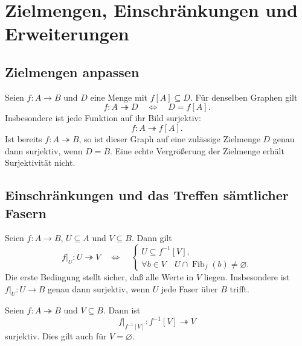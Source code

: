 \chapter{Zielmengen, Einschränkungen und Erweiterungen}
\label{b07guide:ch:restrictions}

\section{Zielmengen anpassen}

\begin{theorem}
\label{b07guide:thm:codomain}
Seien $f\colon A\to B$ und $D$ eine Menge mit $f[A]\subseteq D$.
Für denselben Graphen gilt
\[
 f\colon A\twoheadrightarrow D
 \quad\Longleftrightarrow\quad D=f[A].
\]
Insbesondere ist jede Funktion auf ihr Bild surjektiv:
\[
 f\colon A\twoheadrightarrow f[A].
\]
Ist bereits $f\colon A\twoheadrightarrow B$, so ist dieser Graph
auf eine zulässige Zielmenge $D$ genau dann surjektiv, wenn $D=B$.
Eine echte Vergrößerung der Zielmenge erhält Surjektivität nicht.
\end{theorem}

\section{Einschränkungen und das Treffen sämtlicher Fasern}

\begin{theorem}
\label{b07guide:thm:restriction}
Seien $f\colon A\to B$, $U\subseteq A$ und $V\subseteq B$.
Dann gilt
\[
 f|_U\colon U\twoheadrightarrow V
 \quad\Longleftrightarrow\quad
 \left\{
 \begin{array}{l}
 U\subseteq f^{-1}[V],\\
 \forall b\in V\quad U\cap\operatorname{Fib}_f(b)\ne\varnothing.
 \end{array}\right.
\]
Die erste Bedingung stellt sicher, daß alle Werte in $V$ liegen.
Insbesondere ist $f|_U\colon U\to B$ genau dann surjektiv,
wenn $U$ jede Faser über $B$ trifft.
\end{theorem}

\begin{theorem}
\label{b07guide:thm:preimagerestriction}
Seien $f\colon A\twoheadrightarrow B$ und $V\subseteq B$. Dann ist
\[
 f|_{f^{-1}[V]}\colon f^{-1}[V]\twoheadrightarrow V
\]
surjektiv. Dies gilt auch für $V=\varnothing$.
\end{theorem}

